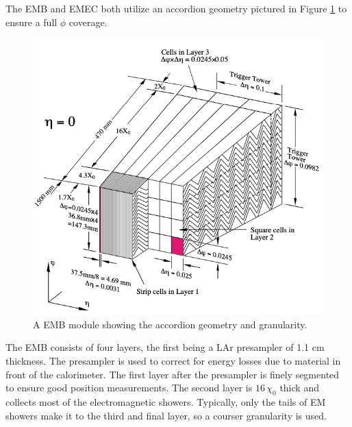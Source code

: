 		The EMB and EMEC both utilize an accordion geometry pictured in Figure \ref{fig:LAr-accordion} to ensure a full $\phi$ coverage. 
		\begin{figure}[!ht]
		\centering
		\includegraphics[width=.45\textwidth,keepaspectratio=true]{chapters/chapter3_experiment/images/LAr_Accordion_Geometry.png}
		\caption{ A EMB module showing the accordion geometry and granularity. \cite{atlas-experiment}}
		\label{fig:LAr-accordion}
		\end{figure}
		The EMB consists of four layers, the first being a LAr presampler of 1.1 cm thickness. The presampler is used to correct for energy losses due to material in front of the calorimeter. The first layer after the presampler is finely segmented to ensure good position measurements. The second layer is $16 \, \chi_0$ thick and collects most of the electromagnetic showers. Typically, only the tails of EM showers make it to the third and final layer, so a courser granularity is used. 

